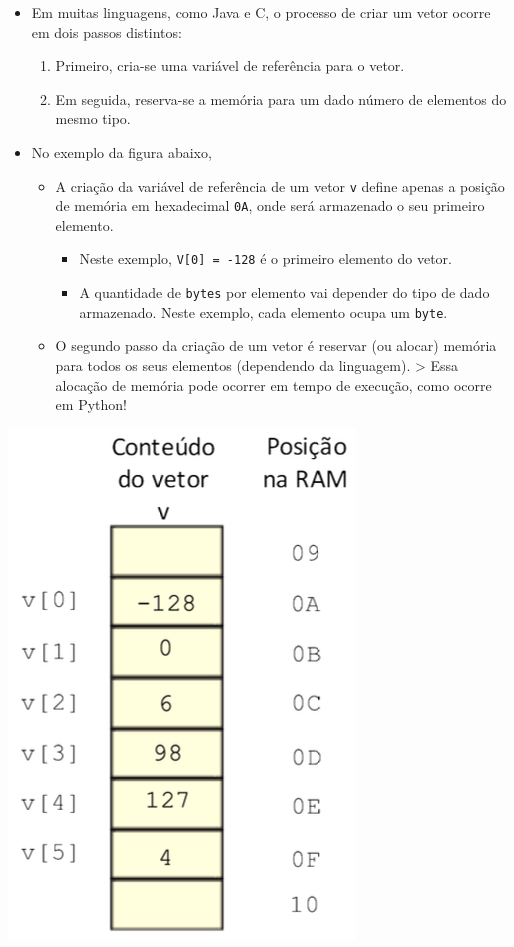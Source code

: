 \documentclass[12pt,a4paper]{article}
\providecommand{\tightlist}{%
      \setlength{\itemsep}{0pt}\setlength{\parskip}{0pt}}
\begin{document}
    \begin{itemize}
\tightlist
\item
  Em muitas linguagens, como Java e C, o processo de criar um vetor
  ocorre em dois passos distintos:

  \begin{enumerate}
  \def\labelenumi{\arabic{enumi}.}
  \tightlist
  \item
    Primeiro, cria-se uma variável de referência para o vetor.
  \item
    Em seguida, reserva-se a memória para um dado número de elementos do
    mesmo tipo.
  \end{enumerate}
\item
  No exemplo da figura abaixo,

  \begin{itemize}
  \tightlist
  \item
    A criação da variável de referência de um vetor \texttt{v} define
    apenas a posição de memória em hexadecimal \texttt{0A}, onde será
    armazenado o seu primeiro elemento.

    \begin{itemize}
    \tightlist
    \item
      Neste exemplo, \texttt{V{[}0{]}\ =\ -128} é o primeiro elemento do
      vetor.
    \item
      A quantidade de \texttt{bytes} por elemento vai depender do tipo
      de dado armazenado. Neste exemplo, cada elemento ocupa um
      \texttt{byte}.
    \end{itemize}
  \item
    O segundo passo da criação de um vetor é reservar (ou alocar)
    memória para todos os seus elementos (dependendo da linguagem).
    \textgreater{} Essa alocação de memória pode ocorrer em tempo de
    execução, como ocorre em Python!
  \end{itemize}
\end{itemize}

\includegraphics{"figs/image33.png"}
\end{document}
